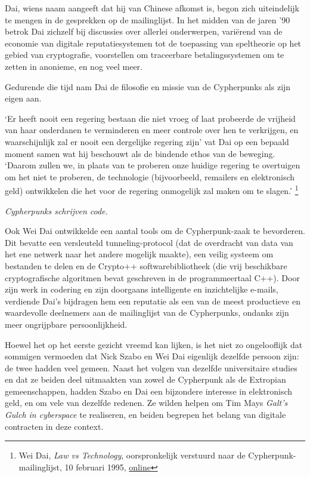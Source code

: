 \documentclass[
  a5paper,
  smalldemyvopaper,11pt,twoside,onecolumn,openright,extrafontsizes,
hidelinks]{memoir}
\begin{document}
Dai, wiens naam aangeeft dat hij van Chinese afkomst is, begon zich
uiteindelijk te mengen in de gesprekken op de mailinglijst. In het
midden van de jaren '90 betrok Dai zichzelf bij discussies over allerlei
onderwerpen, variërend van de economie van digitale reputatiesystemen
tot de toepassing van speltheorie op het gebied van cryptografie,
voorstellen om traceerbare betalingssystemen om te zetten in anonieme,
en nog veel meer.

Gedurende die tijd nam Dai de filosofie en missie van de Cypherpunks als
zijn eigen aan.

`Er heeft nooit een regering bestaan die niet vroeg of laat probeerde de
vrijheid van haar onderdanen te verminderen en meer controle over hen te
verkrijgen, en waarschijnlijk zal er nooit een dergelijke regering zijn'
vat Dai op een bepaald moment samen wat hij beschouwt als de bindende
ethos van de beweging. `Daarom zullen we, in plaats van te proberen onze
huidige regering te overtuigen om het niet te proberen, de technologie
(bijvoorbeeld, remailers en elektronisch geld) ontwikkelen die het voor
de regering onmogelijk zal maken om te slagen.' \footnote{Wei Dai,
  \emph{Law vs Technology}, oorspronkelijk verstuurd naar de
  Cypherpunk-mailinglijst, 10 februari 1995,
  \href{https://cypherpunks.venona.com/date/1995/02/msg00508.html}{online}}

\emph{Cypherpunks schrijven code.}

Ook Wei Dai ontwikkelde een aantal tools om de Cypherpunk-zaak te
bevorderen. Dit bevatte een versleuteld tunneling-protocol (dat de
overdracht van data van het ene netwerk naar het andere mogelijk
maakte), een veilig systeem om bestanden te delen en de Crypto++
softwarebibliotheek (die vrij beschikbare cryptografische algoritmen
bevat geschreven in de programmeertaal C++). Door zijn werk in codering
en zijn doorgaans intelligente en inzichtelijke e-mails, verdiende Dai's
bijdragen hem een reputatie als een van de meest productieve en
waardevolle deelnemers aan de mailinglijst van de Cypherpunks, ondanks
zijn meer ongrijpbare persoonlijkheid.

Hoewel het op het eerste gezicht vreemd kan lijken, is het niet zo
ongelooflijk dat sommigen vermoeden dat Nick Szabo en Wei Dai eigenlijk
dezelfde persoon zijn: de twee hadden veel gemeen. Naast het volgen van
dezelfde universitaire studies en dat ze beiden deel uitmaakten van
zowel de Cypherpunk als de Extropian gemeenschappen, hadden Szabo en Dai
een bijzondere interesse in elektronisch geld, en om vele van dezelfde
redenen. Ze wilden helpen om Tim Mays \emph{Galt's Gulch in cyberspace}
te realiseren, en beiden begrepen het belang van digitale contracten in
deze context.
\end{document}
